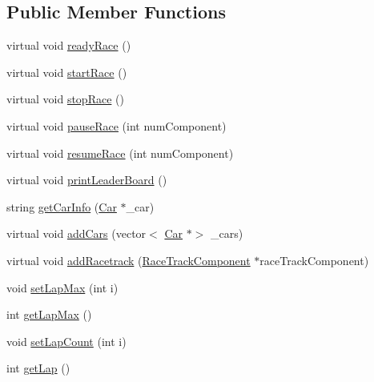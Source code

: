 \subsection*{Public Member Functions}
\begin{DoxyCompactItemize}
\item 
virtual void \mbox{\hyperlink{class_concrete_race_manager_a52c31abcc79c666388c3c9dd8e285c88}{ready\+Race}} ()
\item 
virtual void \mbox{\hyperlink{class_concrete_race_manager_af9266e7de2aec27b970878b8a68e6276}{start\+Race}} ()
\item 
virtual void \mbox{\hyperlink{class_concrete_race_manager_ac55ae9738d8cf5ce6bd1fe2f9356c6f7}{stop\+Race}} ()
\item 
virtual void \mbox{\hyperlink{class_concrete_race_manager_ae9b205b7f73339c73d5f8f4457d01faf}{pause\+Race}} (int num\+Component)
\item 
virtual void \mbox{\hyperlink{class_concrete_race_manager_ad57259cf0ed2055a029fe66dc5d298e1}{resume\+Race}} (int num\+Component)
\item 
virtual void \mbox{\hyperlink{class_concrete_race_manager_abc768656a765994e027399d9e64d7a19}{print\+Leader\+Board}} ()
\item 
string \mbox{\hyperlink{class_concrete_race_manager_a54ba28729c97fa5cd19194374bde58e1}{get\+Car\+Info}} (\mbox{\hyperlink{class_car}{Car}} $\ast$\+\_\+car)
\item 
virtual void \mbox{\hyperlink{class_concrete_race_manager_af66dfe4faeefa1c5011cc6f64fec967e}{add\+Cars}} (vector$<$ \mbox{\hyperlink{class_car}{Car}} $\ast$$>$ \+\_\+cars)
\item 
virtual void \mbox{\hyperlink{class_concrete_race_manager_ab6953cc9a9930e4e0af231f125f8f223}{add\+Racetrack}} (\mbox{\hyperlink{class_race_track_component}{Race\+Track\+Component}} $\ast$race\+Track\+Component)
\item 
void \mbox{\hyperlink{class_concrete_race_manager_a6843a1fada6e4316c0146322b6b209c8}{set\+Lap\+Max}} (int i)
\item 
int \mbox{\hyperlink{class_concrete_race_manager_a1bc8cdd307d126f91ec78fb2575f1a40}{get\+Lap\+Max}} ()
\item 
void \mbox{\hyperlink{class_concrete_race_manager_a907ef66be217b4c087dfc943fcd600b1}{set\+Lap\+Count}} (int i)
\item 
int \mbox{\hyperlink{class_concrete_race_manager_a4a699f41dde54da5c675c4eb00076e79}{get\+Lap}} ()
\end{DoxyCompactItemize}


